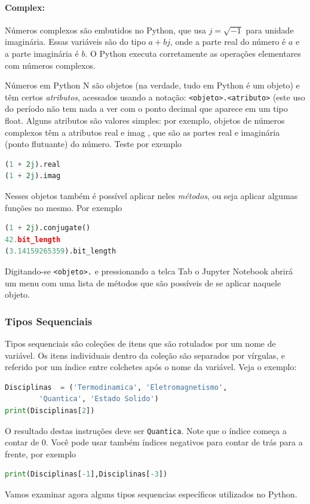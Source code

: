 \paragraph{Complex:} Números complexos são embutidos no Python, que usa $j=\sqrt{-1}$ para unidade imaginária. Essas variáveis são do tipo $a+bj$, onde a parte real do número é $a$ e a parte imaginária é $b$. O Python executa corretamente as operações elementares com números complexos.

Números em Python N são objetos (na verdade, tudo em Python é um objeto) e têm certos
{\it atributos}, acessados usando a notação: {\tt <objeto>.<atributo>} (este uso do
período não tem nada a ver com o ponto decimal que aparece em um tipo float. Alguns atributos são valores simples: por exemplo, objetos de números complexos têm a
atributos real e imag , que são as partes real e imaginária (ponto flutuante) do
número. Teste por exemplo
\begin{lstlisting}[language=Python]
(1 + 2j).real
(1 + 2j).imag
\end{lstlisting}
Nesses objetos também é possível aplicar neles {\it métodos}, ou seja aplicar algumas funções no mesmo. Por exemplo
\begin{lstlisting}[language=Python]
(1 + 2j).conjugate()
42.bit_length
(3.14159265359).bit_length
\end{lstlisting}
Digitando-se {\tt <objeto>.} e pressionando a telca Tab o Jupyter Notebook abrirá um menu com uma lista de métodos que são possíveis de se aplicar naquele objeto. 

\subsubsection{Tipos Sequenciais}
Tipos sequenciais são coleções de itens que são rotulados por um nome de variável. Os itens individuais dentro da coleção são separados por vírgulas, e referido por um índice entre colchetes após o nome da variável. Veja o exemplo:
\begin{lstlisting}[language=Python]
Disciplinas  = ('Termodinamica', 'Eletromagnetismo', 
        'Quantica', 'Estado Solido')
print(Disciplinas[2])
\end{lstlisting}
O resultado destas instruções deve ser {\tt Quantica}. Note que o índice começa a contar de 0. Você pode usar também índices negativos para contar de trás para a frente, por exemplo
\begin{lstlisting}[language=Python]
print(Disciplinas[-1],Disciplinas[-3])
\end{lstlisting}
Vamos examinar agora alguns tipos sequencias específicos utilizados no Python.


